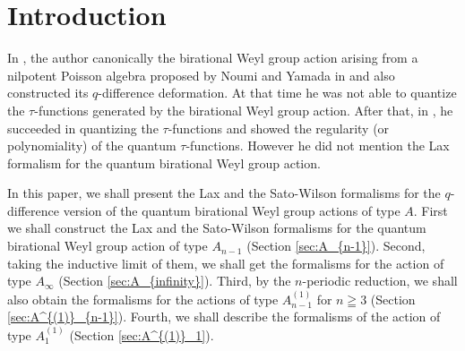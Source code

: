 \documentclass[12pt,twoside]{article}
\theoremstyle{plain} %
\theoremstyle{definition} %
\theoremstyle{definition} %
\numberwithin{theorem}{section}
\numberwithin{equation}{section}
\numberwithin{figure}{section}
\numberwithin{table}{section}
\newcommand\secref[1]{Section \ref{#1}}
\begin{document}
\title{\TITLE}
\author{\AUTHOR}
\date{\DATE}
\maketitle
\begin{abstract}
  \ABSTRACT
\end{abstract}
\tableofcontents
\setcounter{section}{-1} %

\section{Introduction}

In \cite{Kuroki2008}, 
the author canonically  
the birational Weyl group action 
arising from a nilpotent Poisson algebra 
proposed by Noumi and Yamada in \cite{NY0012028}
and also constructed its $q$-difference deformation. 
At that time he was not able to quantize the $\tau$-functions 
generated by the birational Weyl group action.
After that, in \cite{Kuroki2012a}, he succeeded 
in quantizing the $\tau$-functions
and showed the regularity (or polynomiality) 
of the quantum $\tau$-functions.
However he did not mention the Lax formalism 
for the quantum birational Weyl group action.  

In this paper, we shall present the Lax and the Sato-Wilson formalisms
for the $q$-difference version of the quantum birational Weyl group actions
of type $A$.  
First we shall construct the Lax and the Sato-Wilson formalisms 
for the quantum birational Weyl group action of type $A_{n-1}$ 
(\secref{sec:A_{n-1}}).
Second, taking the inductive limit of them,
we shall get the formalisms for the action of type $A_\infty$
(\secref{sec:A_{infinity}}).  
Third, by the $n$-periodic reduction, we shall also obtain the formalisms 
for the actions of type $A^{(1)}_{n-1}$ for $n\geqq 3$
(\secref{sec:A^{(1)}_{n-1}}).
Fourth, we shall describe the formalisms of the action of type $A^{(1)}_1$
(\secref{sec:A^{(1)}_1}).

\end{document}
